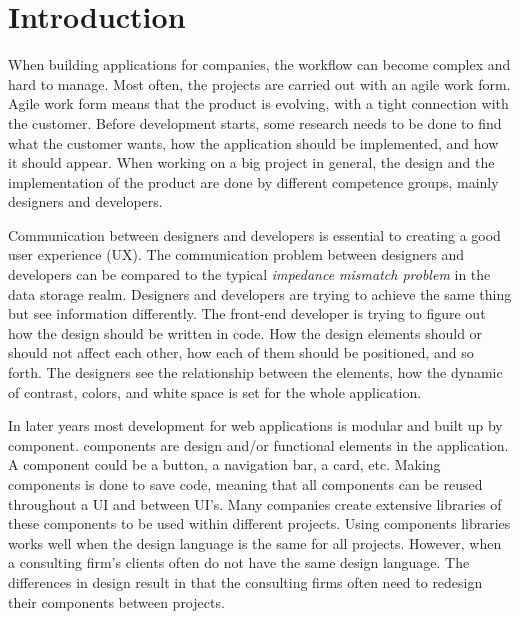 \section{Introduction}



When building applications for companies, the workflow can become complex and hard to manage. Most often, the projects are carried out with an agile work form\cite{cohen2004introduction}. Agile work form means that the product is evolving, with a tight connection with the customer. Before development starts, some research needs to be done to find what the customer wants, how the application should be implemented, and how it should appear. When working on a big project in general, the design and the implementation of the product are done by different competence groups, mainly designers and developers. 

Communication between designers and developers is essential to creating a good user experience (UX). The communication problem between designers and developers can be compared to the typical \textit{impedance mismatch problem} in the data storage realm. Designers and developers are trying to achieve the same thing but see information differently. The front-end developer is trying to figure out how the design should be written in code. How the design elements should or should not affect each other, how each of them should be positioned, and so forth. The designers see the relationship between the elements, how the dynamic of contrast, colors, and white space is set for the whole application. 

In later years most development for web applications is modular and built up by \gls{component}. \Glspl{component} are design and/or functional elements in the application. A \gls{component} could be a button, a navigation bar, a card\cite{babichSimpleDesignTips2020}, etc. Making components is done to save code, meaning that all components can be reused throughout a UI and between UI's. Many companies create extensive libraries of these components to be used within different projects. Using components libraries works well when the design language is the same for all projects. However, when a consulting firm's clients often do not have the same design language. The differences in design result in that the consulting firms often need to redesign their components between projects. 



